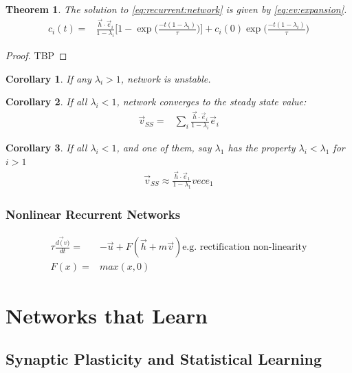 \documentclass[]{article}
\newtheorem{thm}{Theorem}
\newtheorem{cor}{Corollary}
\begin{document}
\begin{thm}
	The solution to \eqref{eq:recurrent:network} is given by \eqref{eq:ev:expansion}.
	\begin{align*}
			c_i(t) =& \frac{\vec{h}\cdot\vec{e}_i}{1-\lambda_i}\big[1-\exp\big(\frac{-t(1-\lambda_i)}{\tau}\big)\big] + c_i(0) \exp\big(\frac{-t(1-\lambda_i)}{\tau}\big)
	\end{align*}
\end{thm}

\begin{proof}
	TBP
\end{proof}

\begin{cor}
	If any $\lambda_i>1$, network is unstable.
\end{cor}

\begin{cor}
	If all $\lambda_i<1$, network converges to the steady state value:
	\begin{align*}
		\vec{v}_{SS}=&\sum_{i}\frac{\vec{h}\cdot\vec{e}_i}{1-\lambda_i}\vec{e}_i
	\end{align*}
\end{cor}

\begin{cor}
	If all $\lambda_i<1$, and one of them, say $\lambda_1$ has the property $\lambda_i<\lambda_1$ for $i>1$
	\begin{align*}
		\vec{v}_{SS}\approx\frac{\vec{h}\cdot\vec{e}_1}{1-\lambda_1}vec{e}_1
	\end{align*}
\end{cor}

\subsubsection{Nonlinear Recurrent Networks}

\begin{align*}
	\tau \frac{d\vec(v)}{dt} =& -\vec{u} +F(\vec{h} +m \vec{v} )\text{e.g. rectification non-linearity}\\
	F(x)=&max(x,0)
\end{align*}

\section{Networks that Learn}\label{sec:week7}

\subsection{Synaptic Plasticity and Statistical Learning}\label{sec:week7:1}
\end{document}
